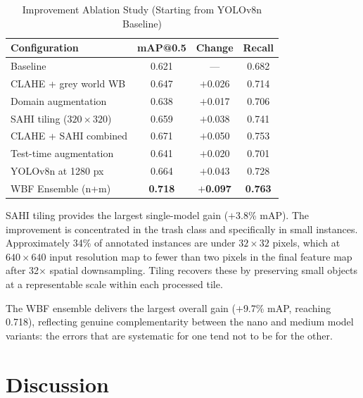 \documentclass[conference]{IEEEtran}
\begin{document}
\begin{table}[htbp]
\caption{Improvement Ablation Study (Starting from YOLOv8n Baseline)}
\label{tab:ablation}
\begin{center}
\begin{tabular}{lccc}
\toprule
\textbf{Configuration} & \textbf{mAP@0.5} & \textbf{Change}
                       & \textbf{Recall} \\
\midrule
Baseline                         & 0.621 & ---     & 0.682 \\
CLAHE + grey world WB            & 0.647 & $+$0.026 & 0.714 \\
Domain augmentation              & 0.638 & $+$0.017 & 0.706 \\
SAHI tiling ($320 \times 320$)   & 0.659 & $+$0.038 & 0.741 \\
CLAHE + SAHI combined            & 0.671 & $+$0.050 & 0.753 \\
Test-time augmentation           & 0.641 & $+$0.020 & 0.701 \\
YOLOv8n at 1280 px               & 0.664 & $+$0.043 & 0.728 \\
WBF Ensemble (n+m)               & \textbf{0.718} & $+$\textbf{0.097}
                                 & \textbf{0.763} \\
\bottomrule
\end{tabular}
\end{center}
\end{table}

SAHI tiling provides the largest single-model gain ($+$3.8\% mAP). The
improvement is concentrated in the trash class and specifically in small
instances. Approximately 34\% of annotated instances are under
$32 \times 32$ pixels, which at $640 \times 640$ input resolution map to
fewer than two pixels in the final feature map after 32$\times$ spatial
downsampling. Tiling recovers these by preserving small objects at a
representable scale within each processed tile.

The WBF ensemble delivers the largest overall gain ($+$9.7\% mAP,
reaching 0.718), reflecting genuine complementarity between the nano and
medium model variants: the errors that are systematic for one tend not to
be for the other.


\section{Discussion}
\end{document}
